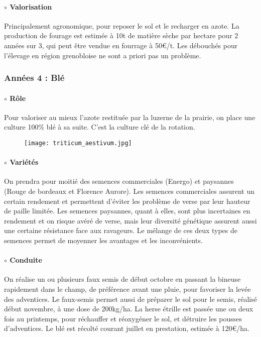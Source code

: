 \documentclass{book}
\begin{document}
\paragraph{$\circ$ Valorisation} Principalement agronomique, pour reposer le sol et le recharger en azote. La production de fourage est estimée à 10t de matière sèche par hectare pour 2 années sur 3, qui peut être vendue en fourrage à 50\euro{}/t. Les débouchés pour l'élevage en région grenobloise ne sont a priori pas un problème. 

\subsubsection{Années 4 : Blé}

\paragraph{$\circ$ Rôle} Pour valoriser au mieux l'azote restituée par la luzerne de la prairie, on place une culture 100\% blé à sa suite. C'est la culture clé de la rotation.

\begin{figure}[h!]
\begin{center}
	\texttt{[image: triticum\_aestivum.jpg]}
\end{center}
\end{figure}

\paragraph{$\circ$ Variétés} On prendra pour moitié des semences commerciales (Energo) et paysannes (Rouge de bordeaux et Florence Aurore). Les semences commerciales assurent un certain rendement et permettent d'éviter les problème de verse par leur hauteur de paille limitée. Les semences paysannes, quant à elles, sont plus incertaines en rendement et on risque avéré de verse, mais leur diversité génétique assurent aussi une certaine résistance face aux ravageurs. Le mélange de ces deux types de semences permet de moyenner les avantages et les inconvénients. 

\paragraph{$\circ$ Conduite} On réalise un ou plusieurs faux semis de début octobre en passant la bineuse rapidement dans le champ, de préférence avant une pluie, pour favoriser la levée des adventices. Le faux-semis permet aussi de préparer le sol pour le semis, réalisé début novembre, à une dose de 200kg/ha. La herse étrille est passée une ou deux fois au printemps, pour réchauffer et réoxygéner le sol, et détruire les pousses d'adventices. Le blé est récolté courant juillet en prestation, estimée à 120\euro{}/ha. 
\end{document}
